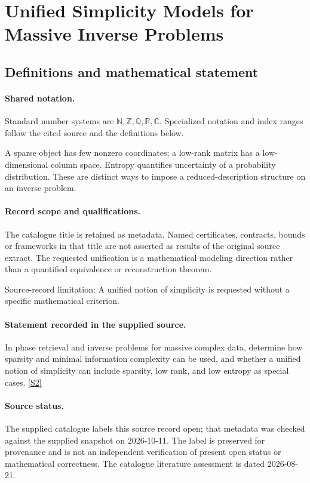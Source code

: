 \documentclass[11pt]{article}
\newcommand{\sref}[2]{\hyperlink{source:#1:#2}{[S#2]}}
\begin{document}
\section{Unified Simplicity Models for Massive Inverse Problems}\label{statement}

\subsection{Definitions and mathematical statement}

\paragraph{Shared notation.}Standard number systems are $\mathbb N,\mathbb Z,\mathbb Q,\mathbb R,\mathbb C$. Specialized notation and index ranges follow the cited source and the definitions below.


A sparse object has few nonzero coordinates; a low-rank matrix has a low-dimensional column space. Entropy quantifies uncertainty of a probability distribution. These are distinct ways to impose a reduced-description structure on an inverse problem.
\paragraph{Record scope and qualifications.}
The catalogue title is retained as metadata. Named certificates, contracts, bounds or frameworks in that title are not asserted as results of the original source extract.
The requested unification is a mathematical modeling direction rather than a quantified equivalence or reconstruction theorem.

Source-record limitation: A unified notion of simplicity is requested without a specific mathematical criterion.
\paragraph{Statement recorded in the supplied source.}
In phase retrieval and inverse problems for massive complex data, determine how sparsity and minimal information complexity can be used, and whether a unified notion of simplicity can include sparsity, low rank, and low entropy as special cases. \sref{statement}{2}
\paragraph{Source status.}
The supplied catalogue labels this source record open; that metadata was checked against the supplied snapshot on 2026-10-11. The label is preserved for provenance and is not an independent verification of present open status or mathematical correctness. The catalogue literature assessment is dated 2026-08-21.
\end{document}
